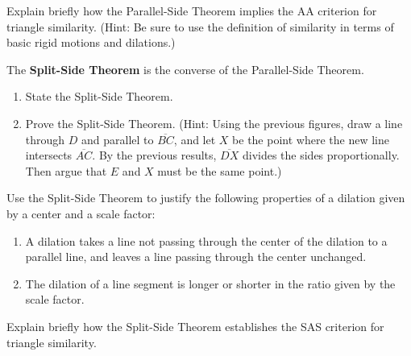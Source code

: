 \begin{prob}
Explain briefly how the Parallel-Side Theorem implies the AA criterion for triangle similarity.  (Hint: Be sure to use the definition of similarity in terms of basic rigid motions and dilations.)  
\end{prob}

\begin{prob}
The \textbf{Split-Side Theorem} is the converse of the Parallel-Side Theorem.   
\begin{enumerate}
\item State the Split-Side Theorem.   
\item Prove the Split-Side Theorem.  (Hint:  Using the previous figures, draw a line through $D$ and parallel to $\overline{BC}$, and let $X$ be the point where the new line intersects $\overline{AC}$.  By the previous results, $\overline{DX}$ divides the sides proportionally.  Then argue that $E$ and $X$ must be the same point.)  
\end{enumerate}
\end{prob}



\begin{prob}
Use the Split-Side Theorem to justify the following properties of a dilation given by a center and a scale factor:
\begin{enumerate}
\item A dilation takes a line not passing through the center of the dilation to a parallel line, and leaves a line passing through the center unchanged.
\item The dilation of a line segment is longer or shorter in the ratio given by the scale factor.
\end{enumerate}

\end{prob}

\begin{prob}
Explain briefly how the Split-Side Theorem establishes the SAS criterion for triangle similarity.  
\end{prob}

